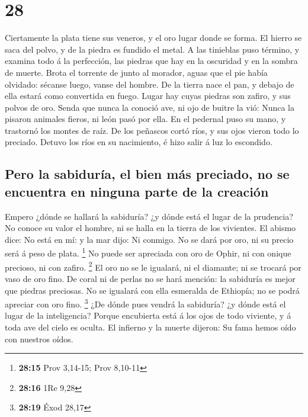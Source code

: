 \hypertarget{section-27}{%
\section{28}\label{section-27}}

 Ciertamente la plata tiene sus veneros, y el oro lugar
donde se forma.  El hierro se saca del polvo, y de la piedra
es fundido el metal.  A las tinieblas puso término, y
examina todo á la perfección, las piedras que hay en la oscuridad y en
la sombra de muerte.  Brota el torrente de junto al morador,
aguas que el pie había olvidado: sécanse luego, vanse del hombre.
 De la tierra nace el pan, y debajo de ella estará como
convertida en fuego.  Lugar hay cuyas piedras son zafiro, y
sus polvos de oro.  Senda que nunca la conoció ave, ni ojo
de buitre la vió:  Nunca la pisaron animales fieros, ni león
pasó por ella.  En el pedernal puso su mano, y trastornó los
montes de raíz.  De los peñascos cortó ríos, y sus ojos
vieron todo lo preciado.  Detuvo los ríos en su nacimiento,
é hizo salir á luz lo escondido.

\hypertarget{pero-la-sabiduruxeda-el-bien-muxe1s-preciado-no-se-encuentra-en-ninguna-parte-de-la-creaciuxf3n}{%
\subsection{Pero la sabiduría, el bien más preciado, no se encuentra en
ninguna parte de la
creación}\label{pero-la-sabiduruxeda-el-bien-muxe1s-preciado-no-se-encuentra-en-ninguna-parte-de-la-creaciuxf3n}}

 Empero ¿dónde se hallará la sabiduría? ¿y dónde está el
lugar de la prudencia?  No conoce su valor el hombre, ni se
halla en la tierra de los vivientes.  El abismo dice: No
está en mí: y la mar dijo: Ni conmigo.  No se dará por oro,
ni su precio será á peso de plata. \footnote{\textbf{28:15} Prov
  3,14-15; Prov 8,10-11}  No puede ser apreciada con oro de
Ophir, ni con onique precioso, ni con zafiro. \footnote{\textbf{28:16}
  1Re 9,28}  El oro no se le igualará, ni el diamante; ni
se trocará por vaso de oro fino.  De coral ni de perlas no
se hará mención: la sabiduría es mejor que piedras preciosas.
 No se igualará con ella esmeralda de Ethiopía; no se podrá
apreciar con oro fino. \footnote{\textbf{28:19} Éxod 28,17}
 ¿De dónde pues vendrá la sabiduría? ¿y dónde está el lugar
de la inteligencia?  Porque encubierta está á los ojos de
todo viviente, y á toda ave del cielo es oculta.  El
infierno y la muerte dijeron: Su fama hemos oído con nuestros oídos.

